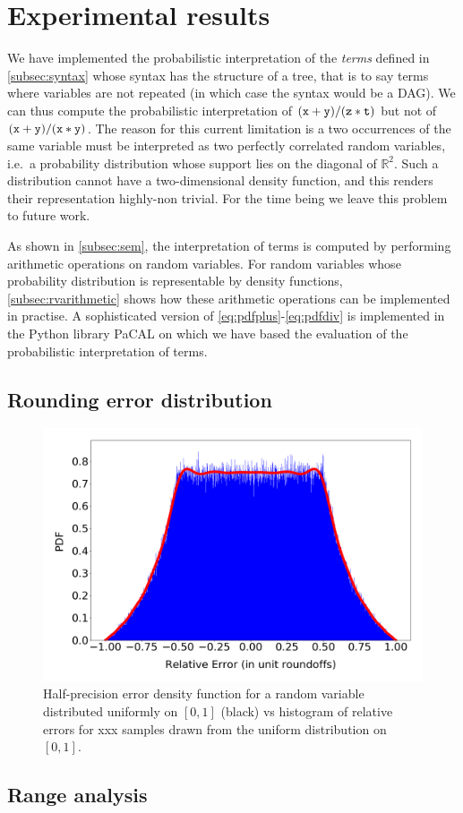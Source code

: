 \documentclass[10pt,conference]{IEEEtran}
\newcommand{\ie}{i.e.\ }
\newcommand{\R}{\mathbb{R}}
\begin{document}
\section{Experimental results}\label{sec:exp}

We have implemented the probabilistic interpretation of the \emph{terms} defined in \cref{subsec:syntax} whose syntax has the structure of a tree, that is to say terms where variables are not repeated (in which case the syntax would be a DAG). We can thus compute the probabilistic interpretation of $\tt (x+y)/(z\ast t)$ but not of $\tt (x+y)/(x\ast y)$. The reason for this current limitation is a two occurrences of the same variable must be interpreted as two perfectly correlated random variables, \ie a probability distribution whose support lies on the diagonal of $\R^2$. Such a distribution cannot have a two-dimensional density function, and this renders their representation highly-non trivial. For the time being we leave this problem to future work.

As shown in \cref{subsec:sem}, the interpretation of terms is computed by performing arithmetic operations on random variables. For random variables whose probability distribution is representable by density functions, \cref{subsec:rvarithmetic} shows how these arithmetic operations can be implemented in practise. A sophisticated version of \cref{eq:pdfplus}-\cref{eq:pdfdiv} is implemented in the Python library PaCAL
\cite{jaroszewicz2012arithmetic}\cite{korzen2014pacal} on which we have based the evaluation of the probabilistic interpretation of terms.

\subsection{Rounding error distribution}

\begin{figure}[h!]
\hspace{-3em}
\includegraphics[scale=0.60]{pics/Relative_Error_Distribution}
\caption{Half-precision error density function for a random variable distributed uniformly on $\left[0,1\right]$ (black) vs histogram of relative errors for xxx samples drawn from the uniform distribution on $\left[0,1\right]$.}
\label{fig:errdist}
\end{figure}

\subsection{Range analysis}


\end{document}
